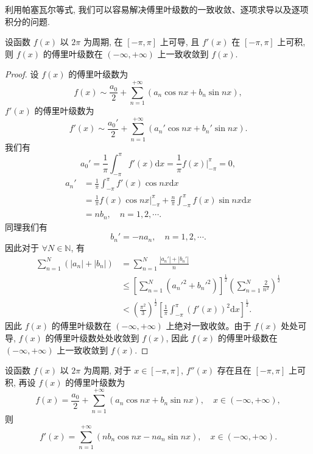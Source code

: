 利用帕塞瓦尔等式, 我们可以容易解决傅里叶级数的一致收敛、逐项求导以及逐项积分的问题.

\begin{theorem}[{傅里叶级数的一致收敛性}]\label{theorem:ma-12-3-5}
设函数 $f(x)$ 以 $2\pi$ 为周期, 在 $[-\pi,\pi]$ 上可导, 且 $f'(x)$ 在 $[-\pi,\pi]$ 上可积, 则 $f(x)$ 的傅里叶级数在 $(-\infty,+\infty)$ 上一致收敛到 $f(x)$.
\end{theorem}


\begin{proof}
设 $f(x)$ 的傅里叶级数为
\[
  f(x)\sim\frac{a_0}{2}+\sum_{n=1}^{+\infty}(a_n\cos nx+b_n\sin nx),
\]
$f'(x)$ 的傅里叶级数为
\[
  f'(x)\sim\frac{a_0'}{2}+\sum_{n=1}^{+\infty}(a_n'\cos nx+b_n'\sin nx).
\]
我们有
\[
  a_0'=\frac1\pi\int_{-\pi}^{\pi}f'(x)\mathrm dx
  =\frac1\pi f(x)\bigg|_{-\pi}^{\pi}=0,
\]
\[
\begin{aligned}
  a_n'
  &=\frac1\pi\int_{-\pi}^{\pi}f'(x)\cos nx\mathrm dx\\
  &=\frac1\pi f(x)\cos nx\bigg|_{-\pi}^{\pi}
    +\frac n\pi\int_{-\pi}^{\pi}f(x)\sin nx\mathrm dx\\
  &=nb_n,\quad n=1,2,\cdots.
\end{aligned}
\]
同理我们有
\[
  b_n'=-na_n,\quad n=1,2,\cdots.
\]
因此对于 $\forall N\in\mathbb N$, 有
\[
\begin{aligned}
  \sum_{n=1}^N(|a_n|+|b_n|)
  &=\sum_{n=1}^N\frac{|a_n'|+|b_n'|}{n}\\
  &\leqslant
  \left[\sum_{n=1}^N(a_n'^2+b_n'^2)\right]^{\frac12}
  \left(\sum_{n=1}^N\frac2{n^2}\right)^{\frac12}\\
  &<\left(\frac{\pi^2}{3}\right)^{\frac12}
  \left[\frac1\pi\int_{-\pi}^{\pi}(f'(x))^2\mathrm dx\right]^{\frac12}.
\end{aligned}
\]
因此 $f(x)$ 的傅里叶级数在 $(-\infty,+\infty)$ 上绝对一致收敛。由于 $f(x)$ 处处可导, $f(x)$ 的傅里叶级数处处收敛到 $f(x)$, 因此 $f(x)$ 的傅里叶级数在 $(-\infty,+\infty)$ 上一致收敛到 $f(x)$.
\end{proof}


\begin{theorem}[{傅里叶级数逐项微分定理}]\label{theorem:ma-12-3-6}
设函数 $f(x)$ 以 $2\pi$ 为周期, 对于 $x\in[-\pi,\pi]$, $f''(x)$ 存在且在 $[-\pi,\pi]$ 上可积, 再设 $f(x)$ 的傅里叶级数为
\[
  f(x)=\frac{a_0}{2}+\sum_{n=1}^{+\infty}(a_n\cos nx+b_n\sin nx),\quad x\in(-\infty,+\infty),
\]
则
\[
  f'(x)=\sum_{n=1}^{+\infty}(nb_n\cos nx-na_n\sin nx),\quad x\in(-\infty,+\infty).
\]
\end{theorem}


